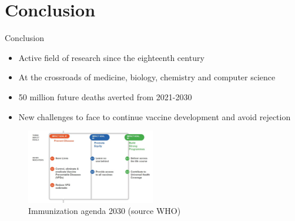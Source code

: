 \section*{Conclusion}

\begin{frame}{Conclusion}
\begin{itemize}
    \item Active field of research since the eighteenth century
    \item At the crossroads of medicine, biology, chemistry and computer science
    \item 50 million future deaths averted from 2021-2030
    \item New challenges to face to continue vaccine development and avoid rejection
\end{itemize}
\begin{figure}
    \centering
    \includegraphics[width=0.5\textwidth]{imgs/Objectives.JPG}
    \caption{Immunization agenda 2030 (source WHO)}
    \label{fig:responses9}
\end{figure}
\end{frame}

